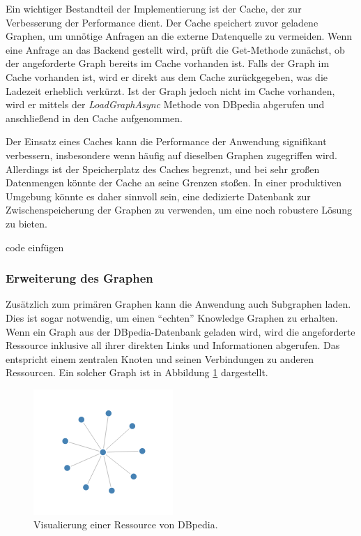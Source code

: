 Ein wichtiger Bestandteil der Implementierung ist der Cache, der zur Verbesserung der Performance dient. Der Cache speichert zuvor geladene Graphen, um unnötige Anfragen an die externe Datenquelle zu vermeiden. Wenn eine Anfrage an das Backend gestellt wird, prüft die Get-Methode zunächst, ob der angeforderte Graph bereits im Cache vorhanden ist. Falls der Graph im Cache vorhanden ist, wird er direkt aus dem Cache zurückgegeben, was die Ladezeit erheblich verkürzt. Ist der Graph jedoch nicht im Cache vorhanden, wird er mittels der \textit{LoadGraphAsync} Methode von DBpedia abgerufen und anschließend in den Cache aufgenommen.

Der Einsatz eines Caches kann die Performance der Anwendung signifikant verbessern, insbesondere wenn häufig auf dieselben Graphen zugegriffen wird. Allerdings ist der Speicherplatz des Caches begrenzt, und bei sehr großen Datenmengen könnte der Cache an seine Grenzen stoßen. In einer produktiven Umgebung könnte es daher sinnvoll sein, eine dedizierte Datenbank zur Zwischenspeicherung der Graphen zu verwenden, um eine noch robustere Lösung zu bieten.

code einfügen

\subsubsection{Erweiterung des Graphen}

Zusätzlich zum primären Graphen kann die Anwendung auch Subgraphen laden. Dies ist sogar notwendig, um einen \enquote{echten} Knowledge Graphen zu erhalten. Wenn ein Graph aus der DBpedia-Datenbank geladen wird, wird die angeforderte Ressource inklusive all ihrer direkten Links und Informationen abgerufen. Das entspricht einem zentralen Knoten und seinen Verbindungen zu anderen Ressourcen. Ein solcher Graph ist in Abbildung \ref{fig:realization:implementation:simpleGraph} dargestellt.

\begin{figure}[h]
    \centering
    \includegraphics[height=.3\textwidth]{images/03/SimpleGraph.png}
    \caption{Visualierung einer Ressource von DBpedia.}
    \label{fig:realization:implementation:simpleGraph}
\end{figure}

